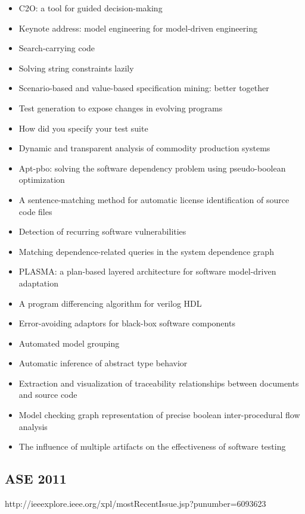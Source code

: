 {\begin{itemize}[itemsep=-1ex]
  \item C2O: a tool for guided decision-making
  \item Keynote address: model engineering for model-driven engineering
  \item Search-carrying code
  \item Solving string constraints lazily
  \item Scenario-based and value-based specification mining: better together
  \item Test generation to expose changes in evolving programs
  \item How did you specify your test suite
  \item Dynamic and transparent analysis of commodity production systems
  \item Apt-pbo: solving the software dependency problem using pseudo-boolean optimization
  \item A sentence-matching method for automatic license identification of source code files
  \item Detection of recurring software vulnerabilities
  \item Matching dependence-related queries in the system dependence graph
  \item PLASMA: a plan-based layered architecture for software model-driven adaptation
  \item A program differencing algorithm for verilog HDL
  \item Error-avoiding adaptors for black-box software components
  \item Automated model grouping
  \item Automatic inference of abstract type behavior
  \item Extraction and visualization of traceability relationships between documents and source code
  \item Model checking graph representation of precise boolean inter-procedural flow analysis
  \item The influence of multiple artifacts on the effectiveness of software testing
\end{itemize}
}

\subsection{ASE 2011}

http://ieeexplore.ieee.org/xpl/mostRecentIssue.jsp?punumber=6093623

